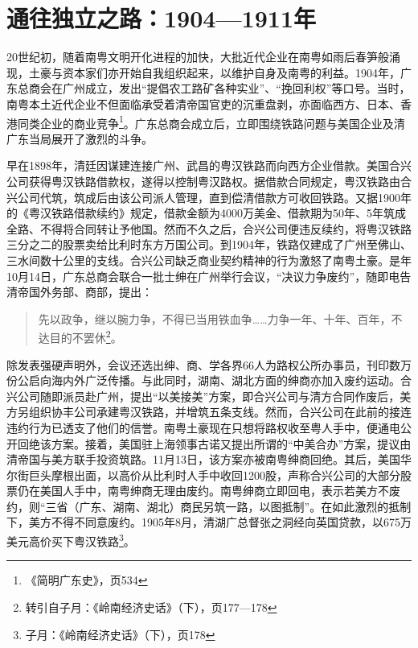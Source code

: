 \section{通往独立之路：1904—1911年}

\indent 20世纪初，随着南粤文明开化进程的加快，大批近代企业在南粤如雨后春笋般涌现，土豪与资本家们亦开始自我组织起来，以维护自身及南粤的利益。1904年，广东总商会在广州成立，发出“提倡农工路矿各种实业”、“挽回利权”等口号。当时，南粤本土近代企业不但面临承受着清帝国官吏的沉重盘剥，亦面临西方、日本、香港同类企业的商业竞争\footnote{《简明广东史》，页534}。广东总商会成立后，立即围绕铁路问题与美国企业及清广东当局展开了激烈的斗争。

早在1898年，清廷因谋建连接广州、武昌的粤汉铁路而向西方企业借款。美国合兴公司获得粤汉铁路借款权，遂得以控制粤汉路权。据借款合同规定，粤汉铁路由合兴公司代筑，筑成后由该公司派人管理，直到偿清借款方可收回铁路。又据1900年的《粤汉铁路借款续约》规定，借款金额为4000万美金、借款期为50年、5年筑成全路、不得将合同转让予他国。然而不久之后，合兴公司便违反续约，将粤汉铁路三分之二的股票卖给比利时东方万国公司。到1904年，铁路仅建成了广州至佛山、三水间数十公里的支线。合兴公司缺乏商业契约精神的行为激怒了南粤土豪。是年10月14日，广东总商会联合一批士绅在广州举行会议，“决议力争废约”，随即电告清帝国外务部、商部，提出：

\begin{quote}

先以政争，继以腕力争，不得已当用铁血争……力争一年、十年、百年，不达目的不罢休\footnote{转引自子月：《岭南经济史话》（下），页177—178}。

\end{quote}

除发表强硬声明外，会议还选出绅、商、学各界66人为路权公所办事员，刊印数万份公启向海内外广泛传播。与此同时，湖南、湖北方面的绅商亦加入废约运动。合兴公司随即派员赴广州，提出“以美接美”方案，即合兴公司与清方合同作废后，美方另组织协丰公司承建粤汉铁路，并增筑五条支线。然而，合兴公司在此前的接连违约行为已透支了他们的信誉。南粤土豪现在只想将路权收至粤人手中，便通电公开回绝该方案。接着，美国驻上海领事古诺又提出所谓的“中美合办”方案，提议由清帝国与美方联手投资筑路。11月13日，该方案亦被南粤绅商回绝。其后，美国华尔街巨头摩根出面，以高价从比利时人手中收回1200股，声称合兴公司的大部分股票仍在美国人手中，南粤绅商无理由废约。南粤绅商立即回电，表示若美方不废约，则“三省（广东、湖南、湖北）商民另筑一路，以图抵制”。在如此激烈的抵制下，美方不得不同意废约。1905年8月，清湖广总督张之洞经向英国贷款，以675万美元高价买下粤汉铁路\footnote{子月：《岭南经济史话》（下），页178}。

